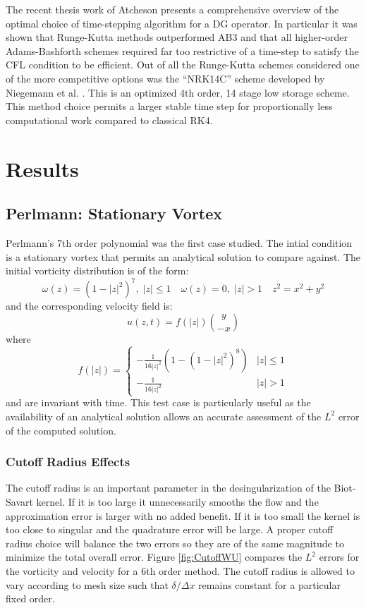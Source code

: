 \documentclass[]{aiaa-tc}%
\newcommand{\ben}[1]{\begin{equation}\label{#1}}
\newcommand{\ee}{\end{equation}}
\begin{document}
The recent thesis work of Atcheson \cite{Reid} presents a comprehensive overview of the optimal choice of time-stepping algorithm for a DG operator. In particular it was shown that Runge-Kutta methods outperformed AB3 and that all higher-order Adams-Bashforth schemes required far too restrictive of a time-step to satisfy the CFL condition to be efficient. Out of all the Runge-Kutta schemes considered one of the more competitive options was the ``NRK14C'' scheme developed by Niegemann et al. \cite{Niegemann}. This is an optimized 4th order, 14 stage low storage scheme. This method choice permits a larger stable time step for proportionally less computational work compared to classical RK4.

\section{Results}

\subsection{Perlmann: Stationary Vortex}
Perlmann's 7th order polynomial  \cite{Perlmann1985} was the first case studied. The intial condition is a stationary vortex that permits an analytical solution to compare against. The initial vorticity distribution is of the form:
\ben{PerlW} \omega(z)=(1-|z|^2)^7, \; |z|\leq 1  \quad \omega(z)=0, \;|z|>1 \quad z^2=x^2+y^2 \ee
and the corresponding velocity field is:
\ben{PerlU} u(z,t)=f(|z|)\binom{y}{-x} \ee
where
\[
f(|z|)=
\begin{cases}
    -\frac{1}{16|z|^2}(1-(1-|z|^2)^8)	& |z| \leq 1\\
    -\frac{1}{16|z|^2} 			& |z|>1
\end{cases}
\]
and are invariant with time. This test case is particularly useful as the availability of an analytical solution allows an accurate assessment of the $L^2$ error of the computed solution.

\subsubsection{Cutoff Radius Effects}\label{Pcutoff}
The cutoff radius is an important parameter in the desingularization of the Biot-Savart kernel. If it is too large it unnecessarily smooths the flow and the approximation error is larger with no added benefit. If it is too small the kernel is too close to singular and the quadrature error will be large. A proper cutoff radius choice will balance the two errors so they are of the same magnitude to minimize the total overall error. Figure \ref{fig:CutoffWU} compares the $L^2$ errors for the vorticity and velocity for a 6th order method. The cutoff radius is allowed to vary according to mesh size such that $\delta/\Delta x$ remains constant for a particular fixed order.
\end{document}
